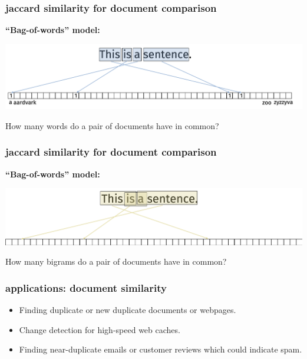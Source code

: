 \documentclass[compress]{beamer}
\begin{document}
\begin{frame}
	\frametitle{jaccard similarity for document comparison}
	\textbf{``Bag-of-words'' model:}
	\begin{center}
		\includegraphics[width=.95\textwidth]{bagofwords.png}
	\end{center}
	
	How many words do a pair of documents have in common?
\end{frame}

\begin{frame}
	\frametitle{jaccard similarity for document comparison}
	\textbf{``Bag-of-words'' model:}
	\begin{center}
		\includegraphics[width=.95\textwidth]{bigrams.png}
	\end{center}
	
	How many bigrams do a pair of documents have in common?
\end{frame}


\begin{frame}
	\frametitle{applications: document similarity}
	\begin{itemize}
		\item Finding duplicate or new duplicate documents or webpages.
		\item Change detection for high-speed web caches.
		\item Finding near-duplicate emails or customer reviews which could indicate spam.
	\end{itemize}
\end{frame}
\end{document}
